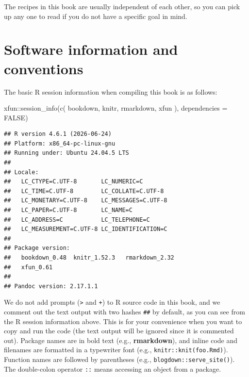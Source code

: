\documentclass[
  11pt,
]{krantz}
\newenvironment{Shaded}{\begin{snugshade}}{\end{snugshade}}
\newcommand{\AttributeTok}[1]{\textcolor[rgb]{0.61,0.61,0.61}{#1}}
\newcommand{\ConstantTok}[1]{\textcolor[rgb]{0,0,0}{#1}}
\newcommand{\FunctionTok}[1]{\textcolor[rgb]{0,0,0}{#1}}
\newcommand{\NormalTok}[1]{#1}
\newcommand{\SpecialCharTok}[1]{\textcolor[rgb]{0,0,0}{#1}}
\newcommand{\StringTok}[1]{\textcolor[rgb]{0.5,0.5,0.5}{#1}}
\begin{document}
The recipes in this book are usually independent of each other, so you can pick up any one to read if you do not have a specific goal in mind.

\hypertarget{software-info}{%
\section*{Software information and conventions}\label{software-info}}


The basic R session information when compiling this book is as follows:

\begin{Shaded}
\begin{Highlighting}[]
\NormalTok{xfun}\SpecialCharTok{::}\FunctionTok{session\_info}\NormalTok{(}\FunctionTok{c}\NormalTok{(}
  \StringTok{\textquotesingle{}bookdown\textquotesingle{}}\NormalTok{, }\StringTok{\textquotesingle{}knitr\textquotesingle{}}\NormalTok{, }\StringTok{\textquotesingle{}rmarkdown\textquotesingle{}}\NormalTok{, }\StringTok{\textquotesingle{}xfun\textquotesingle{}}
\NormalTok{), }\AttributeTok{dependencies =} \ConstantTok{FALSE}\NormalTok{)}
\end{Highlighting}
\end{Shaded}

\begin{verbatim}
## R version 4.6.1 (2026-06-24)
## Platform: x86_64-pc-linux-gnu
## Running under: Ubuntu 24.04.5 LTS
## 
## Locale:
##   LC_CTYPE=C.UTF-8       LC_NUMERIC=C          
##   LC_TIME=C.UTF-8        LC_COLLATE=C.UTF-8    
##   LC_MONETARY=C.UTF-8    LC_MESSAGES=C.UTF-8   
##   LC_PAPER=C.UTF-8       LC_NAME=C             
##   LC_ADDRESS=C           LC_TELEPHONE=C        
##   LC_MEASUREMENT=C.UTF-8 LC_IDENTIFICATION=C   
## 
## Package version:
##   bookdown_0.48  knitr_1.52.3   rmarkdown_2.32
##   xfun_0.61     
## 
## Pandoc version: 2.17.1.1
\end{verbatim}

We do not add prompts (\texttt{\textgreater{}} and \texttt{+}) to R source code in this book, and we comment out the text output with two hashes \texttt{\#\#} by default, as you can see from the R session information above. This is for your convenience when you want to copy and run the code (the text output will be ignored since it is commented out). Package names are in bold text (e.g., \textbf{rmarkdown}), and inline code and filenames are formatted in a typewriter font (e.g., \texttt{knitr::knit(\textquotesingle{}foo.Rmd\textquotesingle{})}). Function names are followed by parentheses (e.g., \texttt{blogdown::serve\_site()}). The double-colon operator \texttt{::} means accessing an object from a package.
\end{document}
